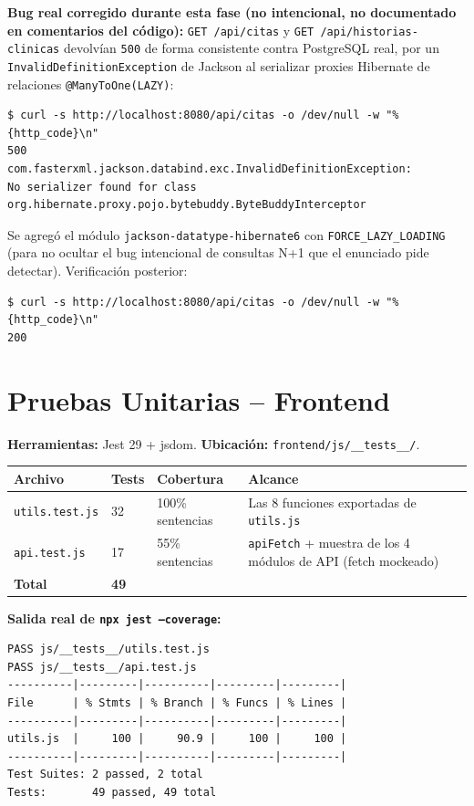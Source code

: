 \documentclass[11pt,a4paper]{article}
\begin{document}
\textbf{Bug real corregido durante esta fase (no intencional, no
documentado en comentarios del c\'odigo):} \texttt{GET /api/citas} y
\texttt{GET /api/historias-clinicas} devolv\'ian \texttt{500} de forma
consistente contra PostgreSQL real, por un
\texttt{InvalidDefinitionException} de Jackson al serializar proxies
Hibernate de relaciones \texttt{@ManyToOne(LAZY)}:
\begin{lstlisting}
$ curl -s http://localhost:8080/api/citas -o /dev/null -w "%{http_code}\n"
500
com.fasterxml.jackson.databind.exc.InvalidDefinitionException:
No serializer found for class
org.hibernate.proxy.pojo.bytebuddy.ByteBuddyInterceptor
\end{lstlisting}
Se agreg\'o el m\'odulo \texttt{jackson-datatype-hibernate6} con
\texttt{FORCE\_LAZY\_LOADING} (para no ocultar el bug intencional de
consultas N+1 que el enunciado pide detectar). Verificaci\'on posterior:
\begin{lstlisting}
$ curl -s http://localhost:8080/api/citas -o /dev/null -w "%{http_code}\n"
200
\end{lstlisting}

\newpage
\section{Pruebas Unitarias -- Frontend}

\textbf{Herramientas:} Jest 29 + jsdom. \textbf{Ubicaci\'on:}
\texttt{frontend/js/\_\_tests\_\_/}.

\begin{longtable}{@{}p{5cm}p{2.5cm}p{2.5cm}p{4cm}@{}}
\toprule
\textbf{Archivo} & \textbf{Tests} & \textbf{Cobertura} & \textbf{Alcance} \\
\midrule
\endhead
\texttt{utils.test.js} & 32 & 100\% sentencias & Las 8 funciones exportadas de \texttt{utils.js} \\
\texttt{api.test.js} & 17 & 55\% sentencias & \texttt{apiFetch} + muestra de los 4 m\'odulos de API (fetch mockeado) \\
\midrule
\textbf{Total} & \textbf{49} & & \\
\bottomrule
\end{longtable}

\textbf{Salida real de \texttt{npx jest --coverage}:}
\begin{lstlisting}
PASS js/__tests__/utils.test.js
PASS js/__tests__/api.test.js
----------|---------|----------|---------|---------|
File      | % Stmts | % Branch | % Funcs | % Lines |
----------|---------|----------|---------|---------|
utils.js  |     100 |     90.9 |     100 |     100 |
----------|---------|----------|---------|---------|
Test Suites: 2 passed, 2 total
Tests:       49 passed, 49 total
\end{lstlisting}
\end{document}
